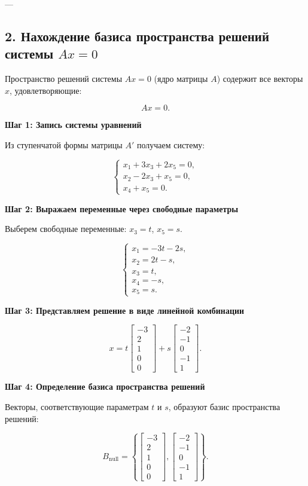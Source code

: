---

\subsection*{2. Нахождение базиса пространства решений системы \( Ax = 0 \)}  

Пространство решений системы \( Ax = 0 \) (ядро матрицы \( A \)) содержит все векторы \( x \), удовлетворяющие:

\[
A x = 0.
\]

\textbf{Шаг 1: Запись системы уравнений}  

Из ступенчатой формы матрицы \( A' \) получаем систему:

\[
\begin{cases}
x_1 + 3x_3 + 2x_5 = 0, \\
x_2 - 2x_3 + x_5 = 0, \\
x_4 + x_5 = 0.
\end{cases}
\]

\textbf{Шаг 2: Выражаем переменные через свободные параметры}  

Выберем свободные переменные: \( x_3 = t \), \( x_5 = s \).

\[
\begin{cases}
x_1 = -3t - 2s, \\
x_2 = 2t - s, \\
x_3 = t, \\
x_4 = -s, \\
x_5 = s.
\end{cases}
\]

\textbf{Шаг 3: Представляем решение в виде линейной комбинации}  

\[
x = t \begin{bmatrix} -3 \\ 2 \\ 1 \\ 0 \\ 0 \end{bmatrix} +
s \begin{bmatrix} -2 \\ -1 \\ 0 \\ -1 \\ 1 \end{bmatrix}.
\]

\textbf{Шаг 4: Определение базиса пространства решений}  

Векторы, соответствующие параметрам \( t \) и \( s \), образуют базис пространства решений:

\[
B_{\text{null}} =
\left\{
\begin{bmatrix} -3 \\ 2 \\ 1 \\ 0 \\ 0 \end{bmatrix},
\begin{bmatrix} -2 \\ -1 \\ 0 \\ -1 \\ 1 \end{bmatrix}
\right\}.
\]

